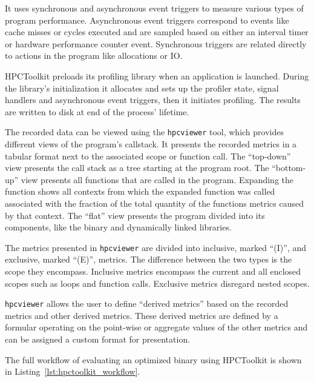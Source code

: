 \documentclass[a4paper, 11pt]{memoir}
\begin{document}
    It uses synchronous and asynchronous event triggers to measure various types of program performance. Asynchronous
    event triggers correspond to events like cache misses or cycles executed and are sampled based on either an interval
    timer or hardware performance counter event. Synchronous triggers are related directly to actions in the program like
    allocations or IO.

    HPCToolkit preloads its profiling library when an application is launched. During the library's initialization it
    allocates and sets up the profiler state, signal handlers and asynchronous event triggers, then it initiates profiling.
    The results are written to disk at end of the process' lifetime.

    The recorded data can be viewed using the \texttt{hpcviewer} tool, which provides different views of the
    program's callstack. It presents the recorded metrics in a tabular format next to the associated scope or function
    call. The \enquote{top-down} view presents the call stack as a tree starting at the program root. The \enquote{bottom-up}
    view presents all functions that are called in the program. Expanding the function shows all contexts from which the
    expanded function was called associated with the fraction of the total quantity of the functions metrics caused by
    that context. The \enquote{flat} view presents the program divided into its components, like the binary and dynamically
    linked libraries.

    The metrics presented in \texttt{hpcviewer} are divided into inclusive, marked \enquote{(I)}, and exclusive,
    marked \enquote{(E)}, metrics. The difference between the two types is the scope they encompass. Inclusive metrics
    encompass the current and all enclosed scopes such as loops and function calls. Exclusive metrics disregard nested
    scopes.

    \texttt{hpcviewer} allows the user to define \enquote{derived metrics} based on the recorded metrics and other
    derived metrics. These derived metrics are defined by a formular operating on the point-wise or aggregate values of
    the other metrics and can be assigned a custom format for presentation.


    The full workflow of evaluating an optimized binary using HPCToolkit is shown in Listing~\ref{lst:hpctoolkit_workflow}.
\end{document}
